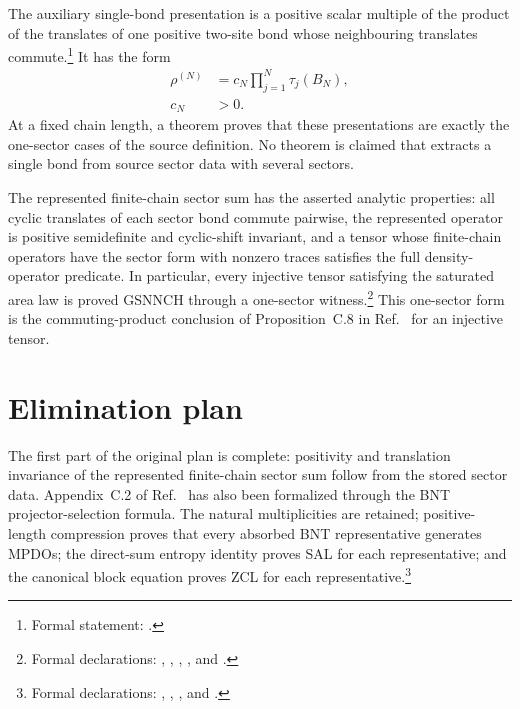 \documentclass{article}
\begin{document}
The auxiliary single-bond presentation is a positive scalar multiple of the
product of the translates of one positive two-site bond whose neighbouring
translates commute.\footnote{\raggedright Formal statement:
.} It has the form
\begin{align}
    \rho^{(N)}
        &=c_N\prod_{j=1}^N\tau_j(B_N),
    \label{eq:cpsv16_gsnnch_sector_decomposition_single_bond_presentation}\\
    c_N
        &>0.
    \label{eq:cpsv16_gsnnch_sector_decomposition_single_bond_positive_scalar}
\end{align}
At a fixed chain length, a theorem proves that these presentations are exactly
the one-sector cases of the source definition. No theorem is claimed that
extracts a single bond from source sector data with several sectors.

The represented finite-chain sector sum has the asserted analytic properties:
all cyclic translates of each sector bond commute pairwise, the represented
operator is positive semidefinite and cyclic-shift invariant, and a tensor
whose finite-chain operators have the sector form with nonzero traces satisfies
the full density-operator predicate. In particular, every injective tensor
satisfying the saturated area law is proved GSNNCH through a one-sector
witness.\footnote{\raggedright Formal declarations:
,
,
,
, and
.}
This one-sector form is the commuting-product conclusion of
Proposition~C.8 in Ref.~\cite{Cirac2016MPDO_arXiv} for an injective tensor.

\section{Elimination plan}

The first part of the original plan is complete: positivity and translation
invariance of the represented finite-chain sector sum follow from the stored
sector data. Appendix~C.2 of Ref.~\cite{Cirac2016MPDO_arXiv} has also been
formalized through the BNT projector-selection formula. The natural
multiplicities are retained; positive-length compression proves that every
absorbed BNT representative generates MPDOs; the direct-sum entropy identity
proves SAL for each representative; and the canonical block equation proves
ZCL for each representative.\footnote{\raggedright Formal declarations:
,
,
, and
.}
\end{document}
